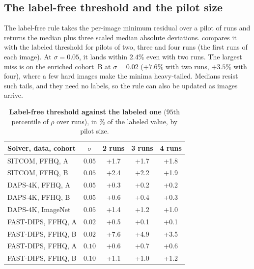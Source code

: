 \subsection{The label-free threshold and the pilot size}
\label{sec:suppl-pilot}
The label-free rule takes the per-image minimum residual over a pilot of runs and returns the median plus three scaled median absolute deviations.
 compares it with the labeled threshold for pilots of two, three and four runs (the first runs of each image).
At $\sigma=0.05$, it lands within $2.4\%$ even with two runs.
The largest miss is on the enriched cohort~B at $\sigma=0.02$ ($+7.6\%$ with two runs, $+3.5\%$ with four), where a few hard images make the minima heavy-tailed.
Medians resist such tails, and they need no labels, so the rule can also be updated as images arrive.

\begin{table}[h]
\centering\small
\begin{tabular}{@{}lcccc@{}}
\toprule
Solver, data, cohort & $\sigma$ & 2 runs & 3 runs & 4 runs \\
\midrule
SITCOM, FFHQ, A & $0.05$ & +1.7 & +1.7 & +1.8 \\
SITCOM, FFHQ, B & $0.05$ & +2.4 & +2.2 & +1.9 \\
DAPS-4K, FFHQ, A & $0.05$ & +0.3 & +0.2 & +0.2 \\
DAPS-4K, FFHQ, B & $0.05$ & +0.6 & +0.4 & +0.3 \\
DAPS-4K, ImageNet & $0.05$ & +1.4 & +1.2 & +1.0 \\
FAST-DIPS, FFHQ, A & $0.02$ & +0.5 & +0.1 & +0.1 \\
FAST-DIPS, FFHQ, B & $0.02$ & +7.6 & +4.9 & +3.5 \\
FAST-DIPS, FFHQ, A & $0.10$ & +0.6 & +0.7 & +0.6 \\
FAST-DIPS, FFHQ, B & $0.10$ & +1.1 & +1.0 & +1.2 \\
\bottomrule
\end{tabular}
\caption{\textbf{Label-free threshold against the labeled one} ($95$th percentile of $\rho$ over \good runs), in \% of the labeled value, by pilot size.}
\label{tab:suppl-pilot}
\end{table}


